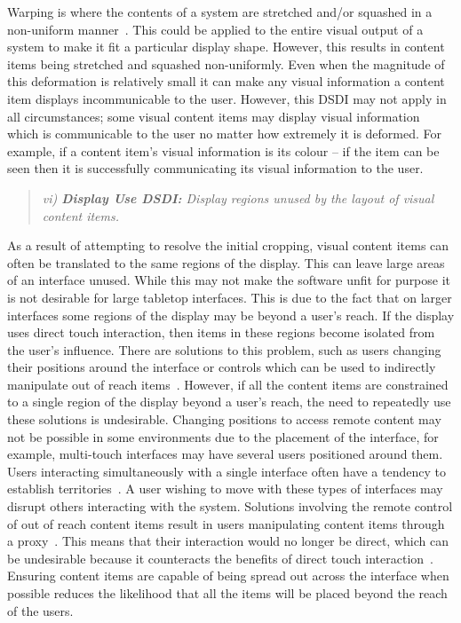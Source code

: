 \documentclass[review,5p,times,twocolumn]{elsarticle}
\begin{document}
Warping is where the contents of a system are stretched and/or squashed in a non-uniform manner~\cite{Milliron2002}.
This could be applied to the entire visual output of a system to make it fit a particular display shape.
However, this results in content items being stretched and squashed non-uniformly.
Even when the magnitude of this deformation is relatively small it can make any visual information a content item displays incommunicable to the user.
However, this \ac{DSDI} may not apply in all circumstances; some visual content items may display visual information which is communicable to the user no matter how extremely it is deformed.
For example, if a content item's visual information is its colour -- if the item can be seen then it is successfully communicating its visual information to the user.

\begin{quote}\emph{vi) \textbf{Display Use \ac{DSDI}:} Display regions unused by the layout of visual content items.}\end{quote}

As a result of attempting to resolve the initial cropping, visual content items can often be translated to the same regions of the display.
This can leave large areas of an interface unused.
While this may not make the software unfit for purpose it is not desirable for large tabletop interfaces.
This is due to the fact that on larger interfaces some regions of the display may be beyond a user's reach.
If the display uses direct touch interaction, then items in these regions become isolated from the user's influence.
There are solutions to this problem, such as users changing their positions around the interface or controls which can be used to indirectly manipulate out of reach items~\cite{Ryall2006a}.
However, if all the content items are constrained to a single region of the display beyond a user's reach, the need to repeatedly use these solutions is undesirable.
Changing positions to access remote content may not be possible in some environments due to the placement of the interface, for example, multi-touch interfaces may have several users positioned around them.
Users interacting simultaneously with a single interface often have a tendency to establish territories~\cite{scott2004}.
A user wishing to move with these types of interfaces may disrupt others interacting with the system.
Solutions involving the remote control of out of reach content items result in users manipulating content items through a proxy~\cite{Smith11}.
This means that their interaction would no longer be direct, which can be undesirable because it counteracts the benefits of direct touch interaction~\cite{Schoning2008}.
Ensuring content items are capable of being spread out across the interface when possible reduces the likelihood that all the items will be placed beyond the reach of the users.
\end{document}

